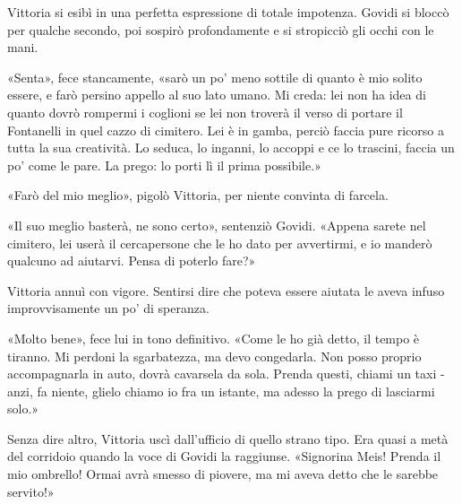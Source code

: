 Vittoria si esibì in una perfetta espressione di totale impotenza. Govidi si bloccò per qualche secondo, poi sospirò profondamente e si stropicciò gli occhi con le mani.

«Senta», fece stancamente, «sarò un po' meno sottile di quanto è mio solito essere, e farò persino appello al suo lato umano. Mi creda: lei non ha idea di quanto dovrò rompermi i coglioni se lei non troverà il verso di portare il Fontanelli in quel cazzo di cimitero. Lei è in gamba, perciò faccia pure ricorso a tutta la sua creatività. Lo seduca, lo inganni, lo accoppi e ce lo trascini, faccia un po' come le pare. La prego: lo porti lì il prima possibile.»

«Farò del mio meglio», pigolò Vittoria, per niente convinta di farcela.

«Il suo meglio basterà, ne sono certo», sentenziò Govidi. «Appena sarete nel cimitero, lei userà il cercapersone che le ho dato per avvertirmi, e io manderò qualcuno ad aiutarvi. Pensa di poterlo fare?»

Vittoria annuì con vigore. Sentirsi dire che poteva essere aiutata le aveva infuso improvvisamente un po' di speranza.

«Molto bene», fece lui in tono definitivo. «Come le ho già detto, il tempo è tiranno. Mi perdoni la sgarbatezza, ma devo congedarla. Non posso proprio accompagnarla in auto, dovrà cavarsela da sola. Prenda questi, chiami un taxi - anzi, fa niente, glielo chiamo io fra un istante, ma adesso la prego di lasciarmi solo.»

Senza dire altro, Vittoria uscì dall'ufficio di quello strano tipo. Era quasi a metà del corridoio quando la voce di Govidi la raggiunse. «Signorina Meis! Prenda il mio ombrello! Ormai avrà smesso di piovere, ma mi aveva detto che le sarebbe servito!»